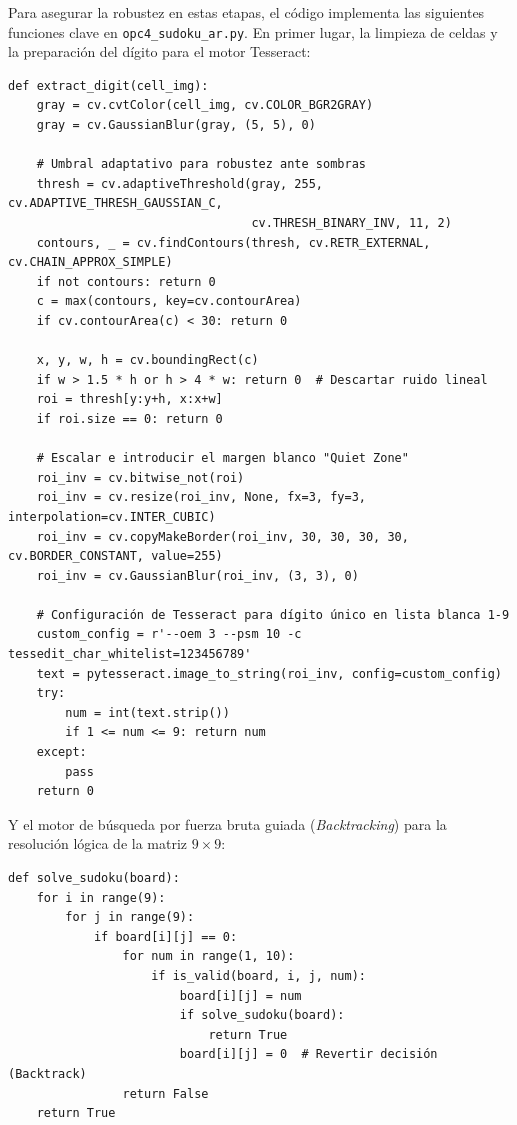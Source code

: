 \documentclass[12pt,a4paper]{article}
\begin{document}
Para asegurar la robustez en estas etapas, el código implementa las siguientes funciones clave en \texttt{opc4\_sudoku\_ar.py}. En primer lugar, la limpieza de celdas y la preparación del dígito para el motor Tesseract:
\begin{verbatim}
def extract_digit(cell_img):
    gray = cv.cvtColor(cell_img, cv.COLOR_BGR2GRAY)
    gray = cv.GaussianBlur(gray, (5, 5), 0)
    
    # Umbral adaptativo para robustez ante sombras
    thresh = cv.adaptiveThreshold(gray, 255, cv.ADAPTIVE_THRESH_GAUSSIAN_C, 
                                  cv.THRESH_BINARY_INV, 11, 2)
    contours, _ = cv.findContours(thresh, cv.RETR_EXTERNAL, cv.CHAIN_APPROX_SIMPLE)
    if not contours: return 0
    c = max(contours, key=cv.contourArea)
    if cv.contourArea(c) < 30: return 0
    
    x, y, w, h = cv.boundingRect(c)
    if w > 1.5 * h or h > 4 * w: return 0  # Descartar ruido lineal
    roi = thresh[y:y+h, x:x+w]
    if roi.size == 0: return 0
    
    # Escalar e introducir el margen blanco "Quiet Zone"
    roi_inv = cv.bitwise_not(roi)
    roi_inv = cv.resize(roi_inv, None, fx=3, fy=3, interpolation=cv.INTER_CUBIC)
    roi_inv = cv.copyMakeBorder(roi_inv, 30, 30, 30, 30, cv.BORDER_CONSTANT, value=255)
    roi_inv = cv.GaussianBlur(roi_inv, (3, 3), 0)
    
    # Configuración de Tesseract para dígito único en lista blanca 1-9
    custom_config = r'--oem 3 --psm 10 -c tessedit_char_whitelist=123456789'
    text = pytesseract.image_to_string(roi_inv, config=custom_config)
    try:
        num = int(text.strip())
        if 1 <= num <= 9: return num
    except:
        pass
    return 0
\end{verbatim}

Y el motor de búsqueda por fuerza bruta guiada (\textit{Backtracking}) para la resolución lógica de la matriz $9 \times 9$:
\begin{verbatim}
def solve_sudoku(board):
    for i in range(9):
        for j in range(9):
            if board[i][j] == 0:
                for num in range(1, 10):
                    if is_valid(board, i, j, num):
                        board[i][j] = num
                        if solve_sudoku(board):
                            return True
                        board[i][j] = 0  # Revertir decisión (Backtrack)
                return False
    return True
\end{verbatim}
\end{document}
